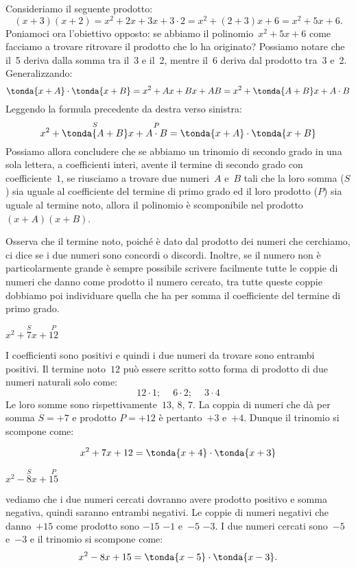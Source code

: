 Consideriamo il seguente prodotto:
\[(x+3)(x+2)=x^{2}+2x+3x+3 \cdot 2=x^{2}+(2+3)x+6=x^{2}+5x+6.\]
Poniamoci ora l'obiettivo opposto: se abbiamo il
polinomio~\(x^{2}+5x+6\) come facciamo a trovare ritrovare il prodotto
che lo ha originato? Possiamo notare che il~5 deriva dalla somma tra
il~3 e il~2, mentre il~6 deriva dal prodotto tra~3 e~2. Generalizzando:
\[\tonda{x+A}\cdot \tonda{x+B}=
  x^{{2}}+Ax+Bx+AB=x^{2}+\tonda{A+B}x+A\cdot B\]
Leggendo la formula precedente da destra verso sinistra:
\[x^{{2}}+\overset{S}{\tonda{A+B}}x+\overset{P}{A \cdot B}
=\tonda{x+A}\cdot\tonda{x+B}\]
Possiamo allora concludere che se abbiamo un trinomio di secondo grado
in una sola lettera, a coefficienti interi, avente il termine di
secondo grado con coefficiente~\(1\), se riusciamo a trovare due numeri~\(A\) 
e~\(B\) tali che la loro somma (\(S\)) sia uguale al
coefficiente del termine di primo grado ed il loro prodotto (\(P\)) sia 
uguale al termine noto, allora il polinomio è scomponibile nel 
prodotto~\((x+A)(x+B)\).

Osserva che il termine noto, poiché è dato dal prodotto dei numeri
che cerchiamo, ci dice se i due numeri sono concordi o discordi.
Inoltre, se il numero non è particolarmente grande è sempre
possibile scrivere facilmente tutte le coppie di numeri che danno come
prodotto il numero cercato, tra tutte queste coppie dobbiamo poi
individuare quella che ha per somma il coefficiente del termine di
primo grado.

 \begin{esempio}
 \(x^{2}+\overset{S}{7}x+\overset{P}{12}\)

I coefficienti sono positivi e quindi i due numeri da trovare sono
entrambi positivi.
Il termine noto~\(12\) può essere scritto sotto forma di prodotto di due
numeri naturali solo come:
\[12\cdot 1;\quad~6\cdot 2;\quad~3\cdot 4\]
Le loro somme sono rispettivamente~\(13\), \(8\), \(7\). 
La coppia di numeri che dà per somma \(S=+7\) e prodotto \(P=+12\) è 
pertanto~\(+3\) e~\(+4\). 
Dunque il trinomio si scompone come:

\[x^{2}+7x+12=\tonda{x+4} \cdot \tonda{x+3}\]
 \end{esempio}

 \begin{esempio}
 \(x^{2}-\overset{S}{8}x+\overset{P}{15}\)

vediamo che i due numeri cercati dovranno avere 
prodotto positivo e somma negativa, quindi saranno entrambi negativi. 
Le coppie di numeri negativi che danno~\(+15\) come prodotto sono \(-15\) 
\(-1\) e~\(-5\) \(-3\).
I due numeri cercati sono~\(-5\) e~\(-3\) e il trinomio si scompone come:
\[x^{2}-8x+15=\tonda{x-5}\cdot \tonda{x-3}.\]
 \end{esempio}


